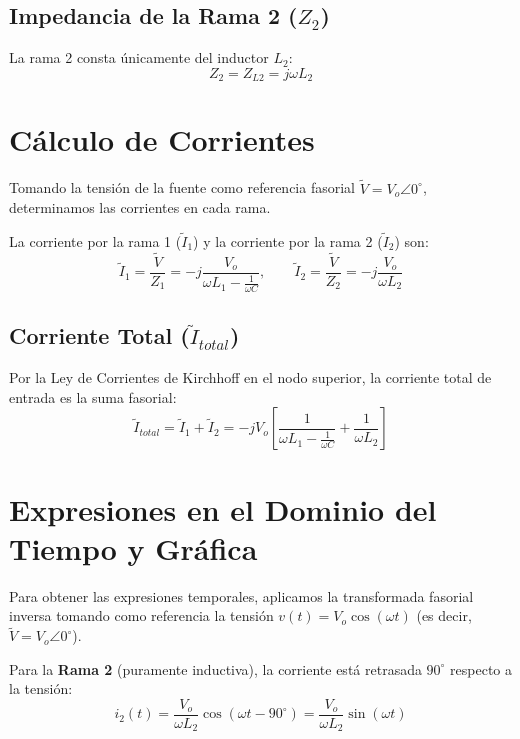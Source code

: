 \documentclass[12pt, a4paper]{article}
\begin{document}
\subsection*{Impedancia de la Rama 2 ($Z_2$)}
La rama 2 consta únicamente del inductor $L_2$:
\begin{equation}
    Z_2 = Z_{L2} = j\omega L_2
\end{equation}

\section*{Cálculo de Corrientes}
Tomando la tensión de la fuente como referencia fasorial $\tilde{V} = V_o \angle 0^\circ$, determinamos las corrientes en cada rama.

La corriente por la rama 1 ($\tilde{I}_1$) y la corriente por la rama 2 ($\tilde{I}_2$) son:
\begin{equation}
    \tilde{I}_1 = \frac{\tilde{V}}{Z_1} = -j \frac{V_o}{\omega L_1 - \frac{1}{\omega C}}, \quad \quad \tilde{I}_2 = \frac{\tilde{V}}{Z_2} = -j \frac{V_o}{\omega L_2}
\end{equation}

\subsection*{Corriente Total ($\tilde{I}_{total}$)}
Por la Ley de Corrientes de Kirchhoff en el nodo superior, la corriente total de entrada es la suma fasorial:
\begin{equation}
    \tilde{I}_{total} = \tilde{I}_1 + \tilde{I}_2 = -j V_o \left[ \frac{1}{\omega L_1 - \frac{1}{\omega C}} + \frac{1}{\omega L_2} \right]
\end{equation}

\section*{Expresiones en el Dominio del Tiempo y Gráfica}
Para obtener las expresiones temporales, aplicamos la transformada fasorial inversa tomando como referencia la tensión $v(t) = V_o \cos(\omega t)$ (es decir, $\tilde{V} = V_o \angle 0^\circ$).

Para la \textbf{Rama 2} (puramente inductiva), la corriente está retrasada $90^\circ$ respecto a la tensión:
\begin{equation}
    i_2(t) = \frac{V_o}{\omega L_2} \cos(\omega t - 90^\circ) = \frac{V_o}{\omega L_2} \sin(\omega t)
\end{equation}
\end{document}
